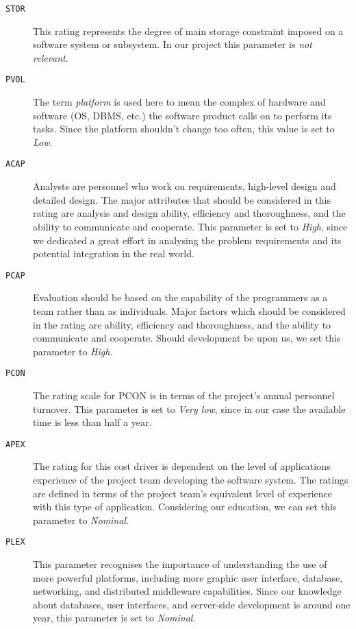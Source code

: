 \begin{description}
	\item [\normalfont\texttt{STOR}] This rating represents the degree of main storage constraint imposed on a software system or subsystem. In our project this parameter is \emph{not relevant}.

	\item [\normalfont\texttt{PVOL}] The term \emph{platform} is used here to mean the complex of hardware and software (OS, DBMS, etc.) the software product calls on to perform its tasks. Since the platform shouldn't change too often, this value is set to \emph{Low}.

	\item [\normalfont\texttt{ACAP}] Analysts are personnel who work on requirements, \mbox{high-level} design and detailed design. The major attributes that should be considered in this rating are analysis and design ability, efficiency and thoroughness, and the ability to communicate and cooperate. This parameter is set to \emph{High}, since we dedicated a great effort in analysing the problem requirements and its potential integration in the real world.

	\item [\normalfont\texttt{PCAP}] Evaluation should be based on the capability of the programmers as a team rather than as individuals. Major factors which should be considered in the rating are ability, efficiency and thoroughness, and the ability to communicate and cooperate. Should development be upon us, we set this parameter to \emph{High}.

	\item [\normalfont\texttt{PCON}] The rating scale for PCON is in terms of the project's annual personnel turnover. This parameter is set to \emph{Very low}, since in our case the available time is less than half a year.

	\item [\normalfont\texttt{APEX}] The rating for this cost driver is dependent on the level of applications experience of the project team developing the software system. The ratings are defined in terms of the project team's equivalent level of experience with this type of application. Considering our education, we can set this parameter to \emph{Nominal}.

	\item [\normalfont\texttt{PLEX}] This parameter recognises the importance of understanding the use of more powerful platforms, including more graphic user interface, database, networking, and distributed middleware capabilities. Since our knowledge about databases, user interfaces, and \mbox{server-side} development is around one year, this parameter is set to \emph{Nominal}.


\end{description}
